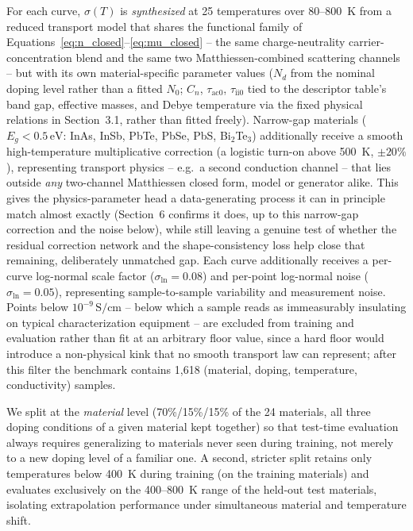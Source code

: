 \documentclass[11pt]{article}
\begin{document}
For each curve, $\sigma(T)$ is \emph{synthesized} at 25 temperatures over 80--800~K from a reduced transport model that shares the functional family of Equations~\ref{eq:n_closed}--\ref{eq:mu_closed} -- the same charge-neutrality carrier-concentration blend and the same two Matthiessen-combined scattering channels -- but with its own material-specific parameter values ($N_d$ from the nominal doping level rather than a fitted $N_0$; $C_n$, $\tau_{\text{ac}0}$, $\tau_{\text{ii}0}$ tied to the descriptor table's band gap, effective masses, and Debye temperature via the fixed physical relations in Section~3.1, rather than fitted freely). Narrow-gap materials ($E_g < 0.5\,\text{eV}$: InAs, InSb, PbTe, PbSe, PbS, Bi$_2$Te$_3$) additionally receive a smooth high-temperature multiplicative correction (a logistic turn-on above 500~K, $\pm 20\%$), representing transport physics -- e.g.\ a second conduction channel -- that lies outside \emph{any} two-channel Matthiessen closed form, model or generator alike. This gives the physics-parameter head a data-generating process it can in principle match almost exactly (Section~6 confirms it does, up to this narrow-gap correction and the noise below), while still leaving a genuine test of whether the residual correction network and the shape-consistency loss help close that remaining, deliberately unmatched gap. Each curve additionally receives a per-curve log-normal scale factor ($\sigma_{\ln}=0.08$) and per-point log-normal noise ($\sigma_{\ln}=0.05$), representing sample-to-sample variability and measurement noise. Points below $10^{-9}\,\text{S/cm}$ -- below which a sample reads as immeasurably insulating on typical characterization equipment -- are excluded from training and evaluation rather than fit at an arbitrary floor value, since a hard floor would introduce a non-physical kink that no smooth transport law can represent; after this filter the benchmark contains 1{,}618 (material, doping, temperature, conductivity) samples.

We split at the \emph{material} level (70\%/15\%/15\% of the 24 materials, all three doping conditions of a given material kept together) so that test-time evaluation always requires generalizing to materials never seen during training, not merely to a new doping level of a familiar one. A second, stricter split retains only temperatures below 400~K during training (on the training materials) and evaluates exclusively on the 400--800~K range of the held-out test materials, isolating extrapolation performance under simultaneous material and temperature shift.
\end{document}
